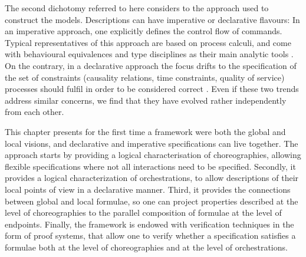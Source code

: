 The second dichotomy referred to here considers to the approach used to
construct the models. Descriptions can have imperative or declarative
flavours: In an imperative approach, one explicitly defines the control
flow of commands. Typical representatives of this approach are based
on process calculi, and come with behavioural equivalences and type
disciplines as their main analytic tools
\cite{Puhlmann2005Using-the-Pi-Ca,lapadula7cows,boreale2006ssc,honda1998lpa,vieira2008conversation}.
On the contrary, in a declarative approach the focus drifts to the
specification of the set of constraints (causality relations, time
constraints, quality of service) processes should fulfil in order to
be considered correct
\cite{pesic2006daf,vanderaalst2006dtt,DDBP08,NORGAARD2005Method-for-gene}.
Even if these two trends address similar concerns, we find that they
have evolved rather independently from each other. 

This chapter presents for the first time a framework were both the
global and local visions, and declarative and imperative
specifications can live together. The approach starts by providing a
logical characterisation of choreographies, allowing flexible
specifications where not all interactions need to be
specified. Secondly, it provides a logical characterization of
orchestrations, to allow descriptions of their local points of view in
a declarative manner. Third, it provides the connections between
global and local formulae, so one can project properties described at
the level of choreographies to the parallel composition of formulae at
the level of endpoints. Finally, the framework is endowed with 
verification techniques in the form of proof systems, that allow one
to verify whether a specification satisfies a formulae both at
the level of choreographies and at the level of orchestrations.


